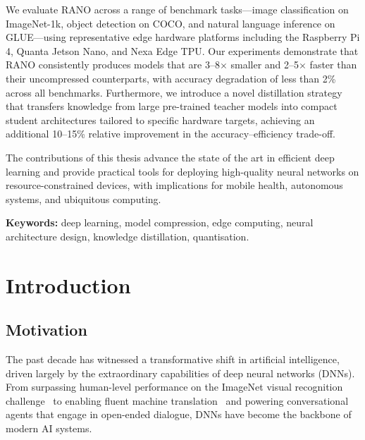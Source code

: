 \documentclass[12pt,a4paper,oneside]{book}
\begin{document}
We evaluate RANO across a range of benchmark tasks---image classification
on ImageNet-1k, object detection on COCO, and natural language inference
on GLUE---using representative edge hardware platforms including the
Raspberry Pi 4, Quanta Jetson Nano, and Nexa Edge TPU. Our experiments
demonstrate that RANO consistently produces models that are 3--8$\times$
smaller and 2--5$\times$ faster than their uncompressed counterparts, with
accuracy degradation of less than 2\% across all benchmarks. Furthermore,
we introduce a novel distillation strategy that transfers knowledge from
large pre-trained teacher models into compact student architectures
tailored to specific hardware targets, achieving an additional 10--15\%
relative improvement in the accuracy--efficiency trade-off.

The contributions of this thesis advance the state of the art in
efficient deep learning and provide practical tools for deploying
high-quality neural networks on resource-constrained devices, with
implications for mobile health, autonomous systems, and ubiquitous
computing.

\vspace{10mm}
\noindent\textbf{Keywords:} deep learning, model compression, edge computing,
neural architecture design, knowledge distillation, quantisation.

\newpage

\tableofcontents
\newpage
\listoffigures
\newpage
\listoftables
\newpage

\mainmatter

\chapter{Introduction}

\section{Motivation}

The past decade has witnessed a transformative shift in artificial
intelligence, driven largely by the extraordinary capabilities of deep
neural networks (DNNs). From surpassing human-level performance on the
ImageNet visual recognition challenge~\cite{he2016deep} to enabling
fluent machine translation~\cite{vaswani2017attention} and powering
conversational agents that engage in open-ended dialogue, DNNs have
become the backbone of modern AI systems.
\end{document}
